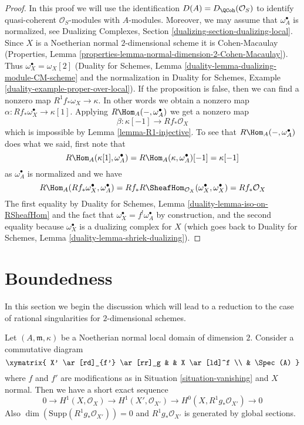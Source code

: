 \begin{proof}
In this proof we will use the identification $D(A) = D_\QCoh(\mathcal{O}_S)$
to identify quasi-coherent $\mathcal{O}_S$-modules with $A$-modules.
Moreover, we may assume that $\omega_A^\bullet$ is normalized, see
Dualizing Complexes, Section \ref{dualizing-section-dualizing-local}.
Since $X$ is a Noetherian normal $2$-dimensional scheme
it is Cohen-Macaulay (Properties, Lemma
\ref{properties-lemma-normal-dimension-2-Cohen-Macaulay}).
Thus $\omega_X^\bullet = \omega_X[2]$ (Duality for Schemes, Lemma
\ref{duality-lemma-dualizing-module-CM-scheme} and the
normalization in Duality for Schemes, Example
\ref{duality-example-proper-over-local}).
If the proposition is false, then we can find a nonzero map
$R^1f_*\omega_X \to \kappa$. In other words we obtain a nonzero map
$\alpha : Rf_*\omega_X^\bullet \to \kappa[1]$.
Applying $R\Hom_A(-, \omega_A^\bullet)$ we get a nonzero map
$$
\beta : \kappa[-1] \longrightarrow Rf_*\mathcal{O}_X
$$
which is impossible by Lemma \ref{lemma-R1-injective}.
To see that $R\Hom_A(-, \omega_A^\bullet)$ does what we said, first
note that
$$
R\Hom_A(\kappa[1], \omega_A^\bullet) =
R\Hom_A(\kappa, \omega_A^\bullet)[-1] =
\kappa[-1]
$$
as $\omega_A^\bullet$ is normalized and we have
$$
R\Hom_A(Rf_*\omega_X^\bullet, \omega_A^\bullet) =
Rf_*R\SheafHom_{\mathcal{O}_X}(\omega_X^\bullet, \omega_X^\bullet) =
Rf_*\mathcal{O}_X
$$
The first equality by
Duality for Schemes, Lemma \ref{duality-lemma-iso-on-RSheafHom}
and the fact that $\omega_X^\bullet = f^!\omega_A^\bullet$
by construction, and the second equality because $\omega_X^\bullet$
is a dualizing complex for $X$ (which goes back to
Duality for Schemes, Lemma \ref{duality-lemma-shriek-dualizing}).
\end{proof}





\section{Boundedness}
\label{section-bounded}

\noindent
In this section we begin the discussion which will lead to a reduction to
the case of rational singularities for $2$-dimensional schemes.

\begin{lemma}
\label{lemma-exact-sequence}
Let $(A, \mathfrak m, \kappa)$ be a Noetherian normal local domain
of dimension $2$. Consider a commutative diagram
$$
\xymatrix{
X' \ar[rd]_{f'} \ar[rr]_g & & X \ar[ld]^f \\
& \Spec(A)
}
$$
where $f$ and $f'$ are modifications as in Situation \ref{situation-vanishing}
and $X$ normal. Then we have a short exact sequence
$$
0 \to H^1(X, \mathcal{O}_X) \to H^1(X', \mathcal{O}_{X'}) \to
H^0(X, R^1g_*\mathcal{O}_{X'}) \to 0
$$
Also $\dim(\text{Supp}(R^1g_*\mathcal{O}_{X'})) = 0$
and $R^1g_*\mathcal{O}_{X'}$ is generated by global sections.
\end{lemma}

